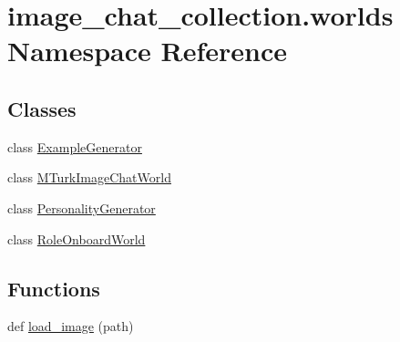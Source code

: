 \hypertarget{namespaceimage__chat__collection_1_1worlds}{}\section{image\+\_\+chat\+\_\+collection.\+worlds Namespace Reference}
\label{namespaceimage__chat__collection_1_1worlds}
\subsection*{Classes}
\begin{DoxyCompactItemize}
\item 
class \hyperlink{classimage__chat__collection_1_1worlds_1_1ExampleGenerator}{Example\+Generator}
\item 
class \hyperlink{classimage__chat__collection_1_1worlds_1_1MTurkImageChatWorld}{M\+Turk\+Image\+Chat\+World}
\item 
class \hyperlink{classimage__chat__collection_1_1worlds_1_1PersonalityGenerator}{Personality\+Generator}
\item 
class \hyperlink{classimage__chat__collection_1_1worlds_1_1RoleOnboardWorld}{Role\+Onboard\+World}
\end{DoxyCompactItemize}
\subsection*{Functions}
\begin{DoxyCompactItemize}
\item 
def \hyperlink{namespaceimage__chat__collection_1_1worlds_aa028ae9a4f66d727036827410f5483ec}{load\+\_\+image} (path)
\end{DoxyCompactItemize}
